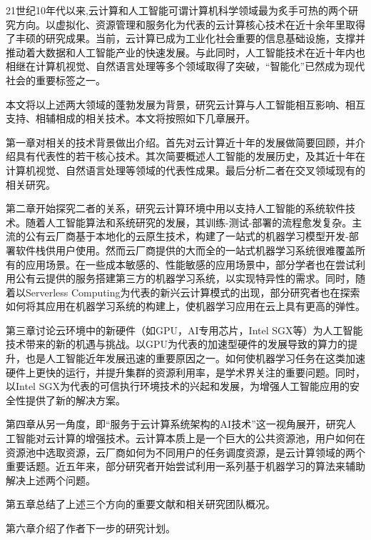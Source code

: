 
\begin{cabstract}
	21世纪10年代以来,云计算和人工智能可谓计算机科学领域最为炙手可热的两个研究方向。以虚拟化、资源管理和服务化为代表的云计算核心技术在近十余年里取得了丰硕的研究成果。当前，云计算已成为工业化社会重要的信息基础设施，支撑并推动着大数据和人工智能产业的快速发展。与此同时，人工智能技术在近十年内也相继在计算机视觉、自然语言处理等多个领域取得了突破，“智能化”已然成为现代社会的重要标签之一。
	
	本文将以上述两大领域的蓬勃发展为背景，研究云计算与人工智能相互影响、相互支持、相辅相成的相关技术。本文将按照如下几章展开。
	
	第一章对相关的技术背景做出介绍。首先对云计算近十年的发展做简要回顾，并介绍具有代表性的若干核心技术。其次简要概述人工智能的发展历史，及其近十年在计算机视觉、自然语言处理等领域的代表性成果。最后分析二者在交叉领域现有的相关研究。
	
	第二章开始探究二者的关系，研究云计算环境中用以支持人工智能的系统软件技术。随着人工智能算法和系统研究的发展，其训练-测试-部署的流程愈发复杂。主流的公有云厂商基于本地化的云原生技术，构建了一站式的机器学习模型开发-部署软件栈供用户使用。然而云厂商提供的大而全的一站式机器学习系统很难覆盖所有的应用场景。在一些成本敏感的、性能敏感的应用场景中，部分学者也在尝试利用公有云提供的服务搭建第三方的机器学习系统，以实现特异性的需求。同时，随着以Serverless Computing为代表的新兴云计算模式的出现，部分研究者也在探索如何将其应用在机器学习系统的构建上，使机器学习应用在云上具有更高的弹性。

	第三章讨论云环境中的新硬件（如GPU，AI专用芯片，Intel SGX等）为人工智能技术带来的新的机遇与挑战。以GPU为代表的加速型硬件的发展导致的算力的提升，也是人工智能近年发展迅速的重要原因之一。如何使机器学习任务在这类加速硬件上更快的运行，并提升集群的资源利用率，是学术界关注的重要问题。同时，以Intel SGX为代表的可信执行环境技术的兴起和发展，为增强人工智能应用的安全性提供了新的解决方案。

	第四章从另一角度，即“服务于云计算系统架构的AI技术”这一视角展开，研究人工智能对云计算的增强技术。云计算本质上是一个巨大的公共资源池，用户如何在资源池中选取资源，云厂商如何为不同用户的任务调度资源，是云计算领域的两个重要话题。近五年来，部分研究者开始尝试利用一系列基于机器学习的算法来辅助解决上述两个问题。
	
	第五章总结了上述三个方向的重要文献和相关研究团队概况。
	
	第六章介绍了作者下一步的研究计划。

\end{cabstract}


